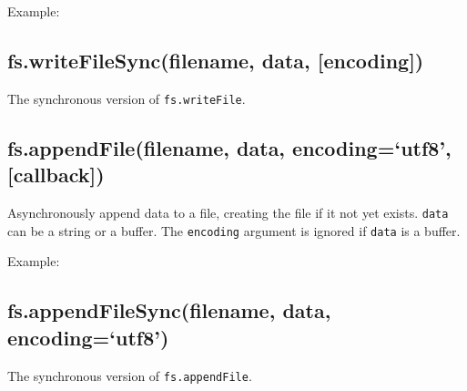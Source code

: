 Example:

\begin{Shaded}
\begin{Highlighting}[]
\NormalTok{(}\NormalTok{, }\NormalTok{, } 
    
  \NormalTok{(}\NormalTok{);}
\NormalTok{\});}
\end{Highlighting}
\end{Shaded}

\subsection{fs.writeFileSync(filename, data, {[}encoding{]})}

The synchronous version of \texttt{fs.writeFile}.

\subsection{fs.appendFile(filename, data, encoding=`utf8',
{[}callback{]})}

Asynchronously append data to a file, creating the file if it not yet
exists. \texttt{data} can be a string or a buffer. The \texttt{encoding}
argument is ignored if \texttt{data} is a buffer.

Example:

\begin{Shaded}
\begin{Highlighting}[]
\NormalTok{(}\NormalTok{, }\NormalTok{, } 
    
  \NormalTok{(}\NormalTok{);}
\NormalTok{\});}
\end{Highlighting}
\end{Shaded}

\subsection{fs.appendFileSync(filename, data, encoding=`utf8')}

The synchronous version of \texttt{fs.appendFile}.

